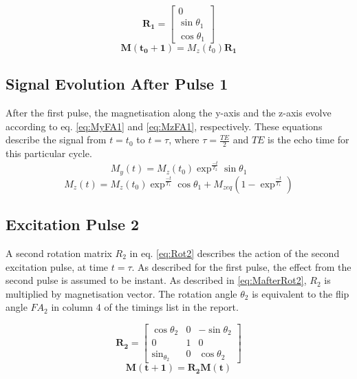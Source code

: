 \documentclass[journal]{IEEEtran}
\begin{document}
\begin{equation} \label{eq:Rot1}
\boldsymbol{R_{1}} =
\begin{bmatrix}
0 \\
 \sin{\theta_{1}}  \\
\cos{\theta_{1}}
 \end{bmatrix}
\end{equation}
\begin{equation} \label{eq:MafterRot1}
\boldsymbol{M(t_{0} + 1)} = M_{z}{(t_{0})} \boldsymbol{R_{1}} 
\end{equation}
\subsection{Signal Evolution After Pulse 1}
After the first pulse, the magnetisation along the y-axis and the z-axis evolve according to eq. \ref{eq:MyFA1} and \ref{eq:MzFA1}, respectively. These equations describe the signal from $t = t_{0}$ to $t =  \tau$, where $\tau = \frac{TE}{2}$ and $TE$ is the echo time for this particular cycle.
\begin{equation}  \label{eq:MyFA1}
M_{y}(t) = M_{z}(t_{0})\exp^{\frac{-t}{T_{2}}}\sin{\theta_{1}}
\end{equation}
\begin{equation} \label{eq:MzFA1}
M_{z}(t) = M_{z}(t_{0})\exp^{\frac{-t}{T_{1}}}\cos{\theta_{1}} + M_{zeq}(1-\exp^{\frac{-t}{T_{1}}})
\end{equation}

\subsection{Excitation Pulse 2}
A second rotation matrix $R_{2}$ in eq. \ref{eq:Rot2} describes the action of the second excitation pulse, at time $t = \tau$. As described for the first pulse, the effect from the second pulse is assumed to be instant. As described in \ref{eq:MafterRot2}, $R_{2}$ is multiplied by magnetisation vector. The rotation angle $\theta_{2}$ is equivalent to the flip angle $FA_{2}$ in column 4 of the timings list in the report.

\begin{equation} \label{eq:Rot2}
\boldsymbol{R_{2}} =
\begin{bmatrix}
\cos{\theta_{2}} & 0 & -\sin{\theta_{2}}\\
0 & 1 & 0 \\
\sin_{\theta_{2}} & 0 &\cos{\theta_{2}}
 \end{bmatrix}
\end{equation}
\begin{equation} \label{eq:MafterRot2}
\boldsymbol{M(t + 1)} = \boldsymbol{R_{2}} \boldsymbol{M(t)}
\end{equation}
\end{document}
